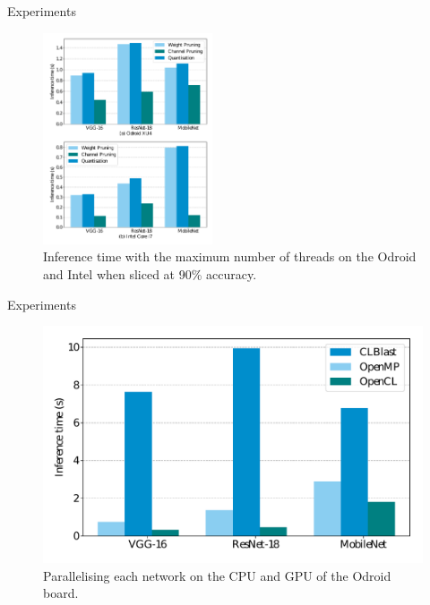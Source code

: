 \documentclass[xcolor=dvipsnames]{beamer}
\begin{document}
\begin{frame}{Experiments}
    \begin{figure}
        \centering
        \includegraphics[width=5cm]{images/inf-mem.pdf}
        \caption{Inference time with the maximum number of threads on the Odroid and Intel when sliced at 90\% accuracy.}
        \label{fig:inf-mem}
    \end{figure}
\end{frame}



\begin{frame}{Experiments}
    

    \begin{figure}
        \centering
        \includegraphics[width=\linewidth]{images/Odroid-GPU.pdf}
        \caption{Parallelising each network on the CPU and GPU of the Odroid board.}
        \label{fig:odroid-gpu}
    \end{figure}
    
\end{frame}
\end{document}
